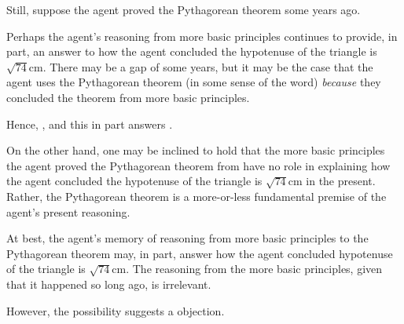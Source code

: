 \begin{note}
{    Still, suppose the agent proved the Pythagorean theorem some years ago.

    Perhaps the agent's reasoning from more basic principles continues to provide, in part, an answer to how the agent concluded the hypotenuse of the triangle is \(\sqrt{74}\text{cm}\).
    There may be a gap of some years, but it may be the case that the agent uses the Pythagorean theorem (in some sense of the word) \emph{because} they concluded the theorem from more basic principles.

    {
      \color{red}
      Hence, \support{}, and this in part answers \qWhyVnP{}.
    }

    On the other hand, one may be inclined to hold that the more basic principles the agent proved the Pythagorean theorem from have no role in explaining how the agent concluded the hypotenuse of the triangle is \(\sqrt{74}\text{cm}\) in the present.
    Rather, the Pythagorean theorem is a more-or-less fundamental premise of the agent's present reasoning.

    At best, the agent's memory of reasoning from more basic principles to the Pythagorean theorem may, in part, answer how the agent concluded hypotenuse of the triangle is \(\sqrt{74}\text{cm}\).
    The reasoning from the more basic principles, given that it happened so long ago, is irrelevant.
  }
  However, the possibility suggests a objection.
\end{note}


